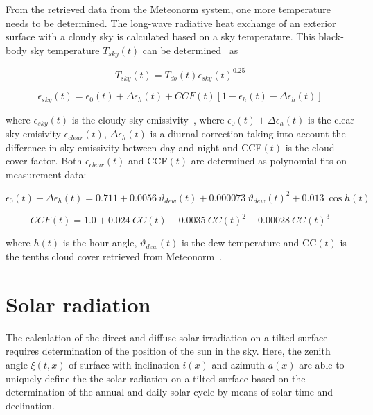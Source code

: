 From the retrieved data from the Meteonorm system, one more temperature needs to be determined. The long-wave radiative heat exchange of an exterior surface with a cloudy sky is calculated based on a sky temperature. This black-body sky temperature $T_{sky}(t)$ can be determined~\cite{Walton1983,Martin1984} as

\begin{equation}
T_{sky}(t)=T_{db}(t)\epsilon_{sky}(t)^{0.25}
\end{equation}

\begin{equation}
\epsilon_{sky}(t) = \epsilon_{0}(t)+\Delta\epsilon_{h}(t)+CCF(t)\left[1-\epsilon_{h}(t)-\Delta\epsilon_{h}(t)\right]
\end{equation}

where $\epsilon_{sky}(t)$ is the cloudy sky emissivity~\cite{Berdahl1982,Berdahl1984,Martin1984}, where $\epsilon_{0}(t)+\Delta\epsilon_{h}(t)$ is the clear sky emisivity $\epsilon_{clear}(t)$, $\Delta\epsilon_{h}(t)$ is a diurnal correction taking into account the difference in sky emissivity between day and night and CCF$(t)$ is the cloud cover factor. Both  $\epsilon_{clear}(t)$ and CCF$(t)$ are determined as polynomial fits on measurement data:

\begin{equation}
\epsilon_{0}(t)+\Delta\epsilon_{h}(t) = 0.711 + 0.0056\ \vartheta_{dew}(t) + 0.000073\ \vartheta_{dew}(t)^{2} + 0.013\ \cos h(t)
\end{equation}

\begin{equation}
CCF(t) = 1.0 + 0.024\ CC(t) - 0.0035\ CC(t)^{2} + 0.00028\ CC(t)^{3}
\end{equation}

where $h(t)$ is the hour angle, $\vartheta_{dew}(t)$ is the dew temperature and CC$(t)$ is the tenths cloud cover retrieved from Meteonorm~\cite{Kasten1979,Perraudeau1990}. 

\section{Solar radiation}
\label{chap:climsol}

The calculation of the direct and diffuse solar irradiation on a tilted surface requires determination of the position of the sun in the sky. Here, the zenith angle $\xi(t,x)$ of surface with inclination $i(x)$ and azimuth $a(x)$ are able to uniquely define the the solar radiation on a tilted surface based on the determination of the annual and daily solar cycle by means of solar time and declination.


